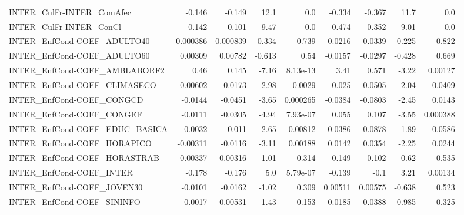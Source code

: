 \begin{tabular}{lrrrrrrrr}
INTER\_CulFr-INTER\_ComAfec             &      -0.146 &       -0.149 &     12.1 &      0.0 &     -0.334 &      -0.367 &         11.7 &           0.0 \\
INTER\_CulFr-INTER\_ConCl               &      -0.142 &       -0.101 &     9.47 &      0.0 &     -0.474 &      -0.352 &         9.01 &           0.0 \\
INTER\_EnfCond-COEF\_ADULTO40           &    0.000386 &     0.000839 &   -0.334 &    0.739 &     0.0216 &      0.0339 &       -0.225 &         0.822 \\
INTER\_EnfCond-COEF\_ADULTO60           &     0.00309 &      0.00782 &   -0.613 &     0.54 &    -0.0157 &     -0.0297 &       -0.428 &         0.669 \\
INTER\_EnfCond-COEF\_AMBLABORF2         &        0.46 &        0.145 &    -7.16 & 8.13e-13 &       3.41 &       0.571 &        -3.22 &       0.00127 \\
INTER\_EnfCond-COEF\_CLIMASECO          &    -0.00602 &      -0.0173 &    -2.98 &   0.0029 &     -0.025 &     -0.0505 &        -2.04 &        0.0409 \\
INTER\_EnfCond-COEF\_CONGCD             &     -0.0144 &      -0.0451 &    -3.65 & 0.000265 &    -0.0384 &     -0.0803 &        -2.45 &        0.0143 \\
INTER\_EnfCond-COEF\_CONGEF             &     -0.0111 &      -0.0305 &    -4.94 & 7.93e-07 &      0.055 &       0.107 &        -3.55 &      0.000388 \\
INTER\_EnfCond-COEF\_EDUC\_BASICA        &     -0.0032 &       -0.011 &    -2.65 &  0.00812 &     0.0386 &      0.0878 &        -1.89 &        0.0586 \\
INTER\_EnfCond-COEF\_HORAPICO           &    -0.00311 &      -0.0116 &    -3.11 &  0.00188 &     0.0142 &      0.0354 &        -2.25 &        0.0244 \\
INTER\_EnfCond-COEF\_HORASTRAB          &     0.00337 &      0.00316 &     1.01 &    0.314 &     -0.149 &      -0.102 &         0.62 &         0.535 \\
INTER\_EnfCond-COEF\_INTER              &      -0.178 &       -0.176 &      5.0 & 5.79e-07 &     -0.139 &        -0.1 &         3.21 &       0.00134 \\
INTER\_EnfCond-COEF\_JOVEN30            &     -0.0101 &      -0.0162 &    -1.02 &    0.309 &    0.00511 &     0.00575 &       -0.638 &         0.523 \\
INTER\_EnfCond-COEF\_SININFO            &     -0.0017 &     -0.00531 &    -1.43 &    0.153 &     0.0185 &      0.0388 &       -0.985 &         0.325 \\

\end{tabular}
